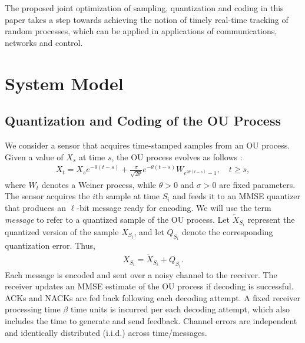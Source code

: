 \documentclass[12pt,journal,onecolumn]{IEEEtran}
\begin{document}
The proposed joint optimization of sampling, quantization and coding in this paper takes a step towards achieving the notion of timely real-time tracking of random processes, which can be applied in applications of communications, networks and control.



\section{System Model}


\subsection{Quantization and Coding of the OU Process}

We consider a sensor that acquires time-stamped samples from an OU process. Given a value of $X_s$ at time $s$, the OU process evolves as follows \cite{ou-brownian-motion, doob-brownian-motion}:
\begin{align} \label{eq_ou_evol}
X_t=X_se^{-\theta(t-s)}+\frac{\sigma}{\sqrt{2\theta}}e^{-\theta(t-s)}W_{e^{2\theta(t-s)}-1},\quad t\geq s,
\end{align}
where $W_t$ denotes a Weiner process, while $\theta>0$ and $\sigma>0$ are fixed parameters. The sensor acquires the $i$th sample at time $S_i$ and feeds it to an MMSE quantizer that produces an $\ell$-bit message ready for encoding. We will use the term {\it message} to refer to a quantized sample of the OU process. Let $\tilde{X}_{S_i}$ represent the quantized version of the sample $X_{S_i}$, and let $Q_{S_i}$ denote the corresponding quantization error. Thus,
\begin{align} \label{eq_qntz_smpl}
X_{S_i}=\tilde{X}_{S_i}+Q_{S_i}.
\end{align}
Each message is encoded and sent over a noisy channel to the receiver. The receiver updates an MMSE estimate of the OU process if decoding is successful. ACKs and NACKs are fed back following each decoding attempt. A fixed receiver processing time $\beta$ time units is incurred per each decoding attempt, which also includes the time to generate and send feedback. Channel errors are independent and identically distributed (i.i.d.) across time/messages.
\end{document}
